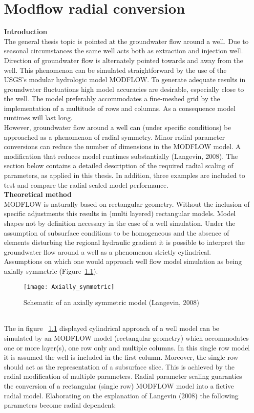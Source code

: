\chapter{Modflow radial conversion}


\textbf{Introduction} \\
The general thesis topic is pointed at the groundwater flow around a well. Due to seasonal circumstances the same well acts both as extraction and injection well. Direction of groundwater flow is alternately pointed towards and away from the well. This phenomenon can be simulated straightforward by the use of the USGS's modular hydrologic model MODFLOW. To generate adequate results in groundwater fluctuations high model accuracies are desirable, especially close to the well. The model preferably accommodates a fine-meshed grid by the implementation of a multitude of rows and columns. As a consequence model runtimes will last long. \\ However, groundwater flow around a well can (under specific conditions) be approached as a phenomenon of radial symmetry. Minor radial parameter conversions can reduce the number of dimensions in the MODFLOW model. A modification that reduces model runtimes substantially (Langevin, 2008). The section below contains a detailed description of the required radial scaling of parameters, as applied in this thesis. In addition, three examples are included to test and compare the radial scaled model performance.  
\bigskip \\
\textbf{Theoretical method} \\
MODFLOW is naturally based on rectangular geometry. Without the inclusion of specific adjustments this results in (multi layered) rectangular models. Model shapes not by definition necessary in the case of a well simulation. Under the assumption of subsurface conditions to be homogeneous and the absence of elements disturbing the regional hydraulic gradient it is possible to interpret the groundwater flow around a well as a phenomenon strictly cylindrical. Assumptions on which one would approach well flow model simulation as being axially symmetric (Figure~\ref{fig:Axially}).
\begin{figure}[h!]
 \centering\texttt{[image: Axially\_symmetric]}
 \captionsetup{justification=centering}
 \caption{Schematic of an axially symmetric model (Langevin, 2008)}
 \label{fig:Axially}
\end{figure} 
\bigskip \\
The in figure ~\ref{fig:Axially} displayed cylindrical approach of a well model can be simulated by an MODFLOW model (rectangular geometry) which accommodates one or more layer(s), one row only and multiple columns. In this single row model it is assumed the well is included in the first column. Moreover, the single row should act as the representation of a subsurface slice. This is achieved by the radial modification of multiple parameters. Radial parameter scaling guaranties the conversion of a rectangular (single row) MODFLOW model into a fictive radial model. Elaborating on the explanation of Langevin (2008) the following parameters become radial dependent:    
  

